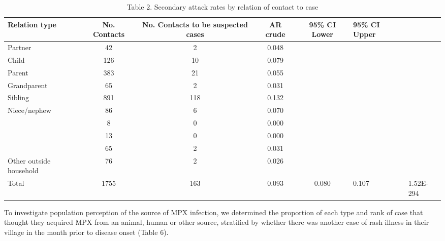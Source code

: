 \begin{table}[!hb]
    \begin{tabular}{@{}lcccc@{}}
    \toprule
     Relation type & No. Contacts & No. Contacts to be suspected cases & AR crude & 95\% CI Lower  & 95\% CI Upper  \\
     \cmidrule
    Partner & 42 & 2 & 0.048 & ~  & ~ & ~ \\ 
    Child & 126 & 10 & 0.079 & ~  & ~ & ~ \\                  
    Parent & 383 & 21 & 0.055 & ~  & ~  & ~ \\
    Grandparent & 65       & 2     & 0.031 & ~  & ~  & ~ \\
    Sibling & 891      & 118   & 0.132  & ~  & ~  & ~ \\
    Niece/nephew & 86       & 6     & 0.070  & ~  & ~  & ~ \\
    ~   & 8        & 0     & 0.000 & ~  & ~  & ~ \\
    ~   & 13       & 0     & 0.000  & ~  & ~  & ~ \\
    ~   & 65       & 2     & 0.031   & ~  & ~  & ~ \\
    Other outside household & 76 & 2 & 0.026 & ~  & ~  & ~ \\
    Total & 1755 & 163 & 0.093 & 0.080 & 0.107 & 1.52E-294 \\
    \bottomrule
    \end{tabular}
    \caption{Table 2. Secondary attack rates by relation of contact to case}
    \label{table2}
\end{table}


To investigate population perception of the source of MPX infection, we determined the proportion of each type and rank of case that thought they acquired MPX from an animal, human or other source, stratified by whether there was another case of rash illness in their village in the month prior to disease onset (Table 6). 
